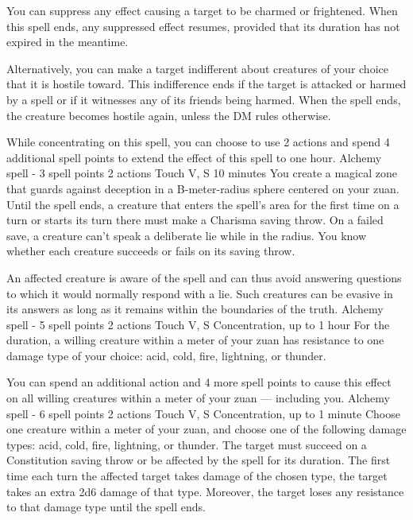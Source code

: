         You can suppress any effect causing a target to be charmed or frightened.
        When this spell ends, any suppressed effect resumes, provided that its duration has not expired in the meantime.

        Alternatively, you can make a target indifferent about creatures of your choice that it is hostile toward.
        This indifference ends if the target is attacked or harmed by a spell or if it witnesses any of its friends being harmed.
        When the spell ends, the creature becomes hostile again, unless the DM rules otherwise.

        While concentrating on this spell, you can choose to use 2 actions and spend 4 additional spell points to extend the effect of this spell to one hour.
        {Alchemy spell - 3 spell points}
        {2 actions}
        {Touch}
        {V, S}
        {10 minutes}
        You create a magical zone that guards against deception in a B-meter-radius sphere centered on your zuan.
        Until the spell ends, a creature that enters the spell's area for the first time on a turn or starts its turn there must make a Charisma saving throw.
        On a failed save, a creature can't speak a deliberate lie while in the radius.
        You know whether each creature succeeds or fails on its saving throw.

        An affected creature is aware of the spell and can thus avoid answering questions to which it would normally respond with a lie.
        Such creatures can be evasive in its answers as long as it remains within the boundaries of the truth.
        {Alchemy spell - 5 spell points}
        {2 actions}
        {Touch}
        {V, S}
        {Concentration, up to 1 hour}
        For the duration, a willing creature within a meter of your zuan has resistance to one damage type of your choice: acid, cold, fire, lightning, or thunder.

        You can spend an additional action and 4 more spell points to cause this effect on all willing creatures within a meter of your zuan --- including you.
        {Alchemy spell - 6 spell points}
        {2 actions}
        {Touch}
        {V, S}
        {Concentration, up to 1 minute}
        Choose one creature within a meter of your zuan, and choose one of the following damage types: acid, cold, fire, lightning, or thunder.
        The target must succeed on a Constitution saving throw or be affected by the spell for its duration.
        The first time each turn the affected target takes damage of the chosen type, the target takes an extra 2d6 damage of that type.
        Moreover, the target loses any resistance to that damage type until the spell ends.


